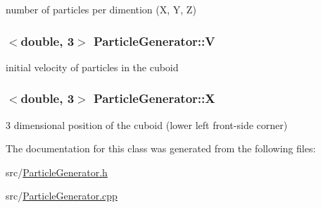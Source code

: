 number of particles per dimention (X, Y, Z) \hypertarget{classParticleGenerator_a692c7f5fd0509035f0a1a225996021e2}{
\subsubsection[{V}]{$<$double, 3$>$ Particle\+Generator\+::\+V\hspace{0.3cm}{\ttfamily [private]}}}\label{classParticleGenerator_a692c7f5fd0509035f0a1a225996021e2}
initial velocity of particles in the cuboid \hypertarget{classParticleGenerator_aaf7df826188798efb4f9ae55daa54a5a}{
\subsubsection[{X}]{$<$double, 3$>$ Particle\+Generator\+::\+X\hspace{0.3cm}{\ttfamily [private]}}}\label{classParticleGenerator_aaf7df826188798efb4f9ae55daa54a5a}
3 dimensional position of the cuboid (lower left front-\/side corner) 

The documentation for this class was generated from the following files\+:\begin{DoxyCompactItemize}
\item 
src/\hyperlink{ParticleGenerator_8h}{Particle\+Generator.\+h}\item 
src/\hyperlink{ParticleGenerator_8cpp}{Particle\+Generator.\+cpp}\end{DoxyCompactItemize}
